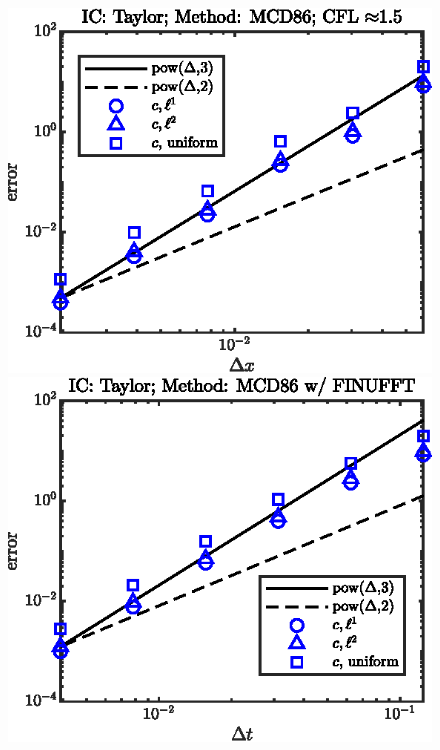 \documentclass[11pt,letterpaper]{article}
\begin{document}
\begin{figure}[H]
    \centering
    \includegraphics{figs/nonlin_conv_order_Taylor_MCD86}
    \includegraphics{figs/nonlin_conv_order_Taylor_finu_MCD86}

\end{figure}
\end{document}
